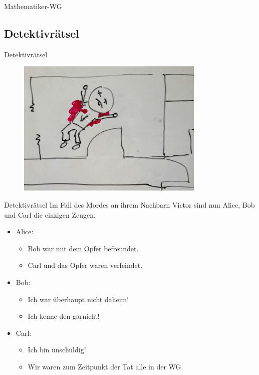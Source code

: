 \documentclass{beamer}
\newcommand{\code}[1]{
	\begin{mdframed}
		
	\end{mdframed}
}
\begin{document}
\begin{frame}{Mathematiker-WG}
	\code{demos/mathematiker_wg.pl}
\end{frame}

\subsection{Detektivrätsel}

\begin{frame}{Detektivrätsel}
	\begin{figure}
		\includegraphics[width=0.8\textwidth]{images/victor}
	\end{figure}
\end{frame}

\begin{frame}{Detektivrätsel}
	Im Fall des Mordes an ihrem Nachbarn Victor sind nun Alice, Bob und Carl die einzigen Zeugen.
	\begin{itemize}
		\item Alice:
		\begin{itemize}
			\item Bob war mit dem Opfer befreundet.
			\item Carl und das Opfer waren verfeindet.
		\end{itemize}
		\item Bob:
		\begin{itemize}
			\item Ich war überhaupt nicht daheim!
			\item Ich kenne den garnicht!
		\end{itemize}
		\item Carl:
		\begin{itemize}
			\item Ich bin unschuldig!
			\item Wir waren zum Zeitpunkt der Tat alle in der WG.
		\end{itemize}
	\end{itemize}
\end{frame}
\end{document}
